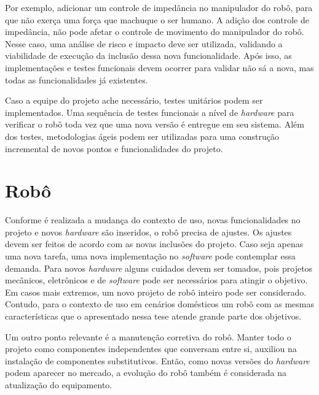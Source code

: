 Por exemplo, adicionar um controle de impedância no manipulador do robô, para que não exerça uma força que machuque o ser humano. A adição dos controle de impedância, não pode afetar o controle de movimento do manipulador do robô. Nesse caso, uma análise de risco e impacto deve ser utilizada, validando a viabilidade de execução da inclusão dessa nova funcionalidade. Após isso, as implementações e testes funcionais devem ocorrer para validar não sá a nova, mas todas as funcionalidades já existentes.

Caso a equipe do projeto ache necessário, testes unitários podem ser implementados. Uma sequência de testes funcionais a nível de \emph{hardware} para verificar o robô toda vez que uma nova versão é entregue em seu sistema. Além dos testes, metodologias ágeis podem ser utilizadas para uma construção incremental de novos pontos e funcionalidades do projeto.

\section{Robô}
\label{sec:robo2}
Conforme é realizada a mudança do contexto de uso, novas funcionalidades no projeto e novos \emph{hardware} são inseridos, o robô precisa de ajustes. Os ajustes devem ser feitos de acordo com as novas inclusões do projeto. Caso seja apenas uma nova tarefa, uma nova implementação no \emph{software} pode contemplar essa demanda. Para novos \emph{hardware} alguns cuidados devem ser tomados, pois projetos mecânicos, eletrônicos e de \emph{software} pode ser necessários para atingir o objetivo. Em casos mais extremos, um novo projeto de robô inteiro pode ser considerado. Contudo, para o contexto de uso em cenários domésticos um robô com as mesmas características que o apresentado nessa tese atende grande parte dos objetivos.

Um outro ponto relevante é a manutenção corretiva do robô. Manter todo o projeto como componentes independentes que conversam entre si, auxiliou na instalação de componentes substitutivos. Então, como novas versões do \emph{hardware} podem aparecer no mercado, a evolução do robô também é considerada na atualização do equipamento.


